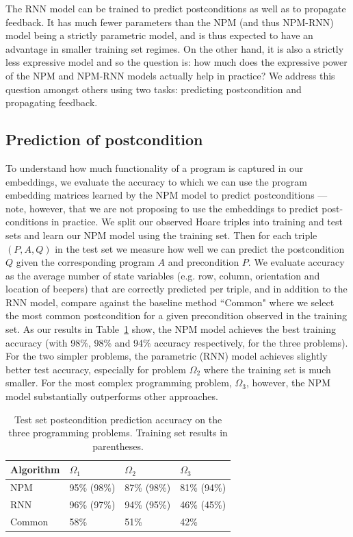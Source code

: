 The RNN model can be trained to predict postconditions
as well as to propagate feedback. It has much fewer parameters
than the NPM (and thus NPM-RNN) model
being a strictly parametric model, and is thus expected to 
have an advantage in smaller training set regimes.  On the other hand,
it is also a strictly less expressive model and so the question
is: how much does the expressive power of the NPM and NPM-RNN models
actually help in practice?  We address this question amongst others
using two tasks: predicting postcondition and propagating feedback.

\subsection{Prediction of postcondition}
To understand how much 
  functionality of a program
is captured in our embeddings, we evaluate the accuracy to which we can use the 
program embedding matrices learned by the NPM model
to predict postconditions --- note, however, that
we are not proposing to use the embeddings to predict post-conditions in practice.
We split our observed Hoare triples into training and  test sets and learn our NPM model using the training set. 
Then for each triple $(P, A, Q)$ in the test set we measure how well we can predict the postcondition $Q$ given the corresponding program $A$ and precondition $P$. We evaluate accuracy as the average number of state variables (e.g. row, column, orientation and  location of beepers) that are correctly predicted per triple, and
in addition to the RNN model, compare against the baseline method ``Common" where we select the most common postcondition for a given precondition observed in the training set. 
As our results in Table~\ref{tab:results1} show,
the NPM model achieves the best training accuracy
(with 98\%, 98\% and 94\% accuracy respectively, for the three problems). 
For the two simpler problems, the parametric (RNN) model achieves slightly better test accuracy, especially for problem $\Omega_2$ where the training set is much smaller. For the most complex programming problem, $\Omega_3$, however, the NPM model substantially outperforms other approaches.

\begin{table}[t]
  \centering
  \begin{tabular}{@{}llll}
     \toprule
        Algorithm & $\Omega_1$ & $\Omega_2$ & $\Omega_3$  \\
    \midrule
    NPM & 95\% (98\%)  & 87\% (98\%) & 81\% (94\%)  \\
    RNN & 96\% (97\%)  & 94\% (95\%) & 46\% (45\%)  \\
    Common & 58\%  &  51\% & 42\% \\
    \bottomrule
  \end{tabular}
  \caption[Postcondition prediction accuracy]{Test set postcondition prediction accuracy on 
  the three programming problems. Training set results in parentheses.}
  \label{tab:results1}
\end{table}


